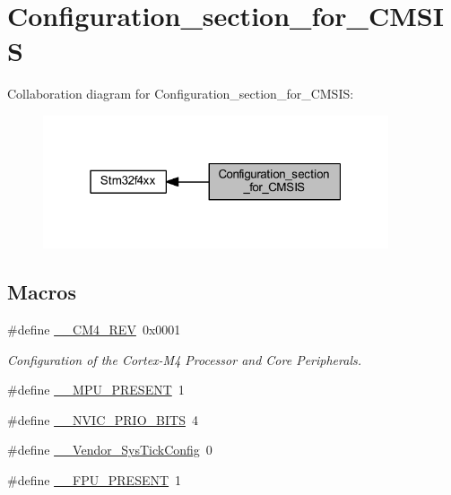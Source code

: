 \hypertarget{group___configuration__section__for___c_m_s_i_s}{}\section{Configuration\+\_\+section\+\_\+for\+\_\+\+C\+M\+S\+IS}
\label{group___configuration__section__for___c_m_s_i_s}
Collaboration diagram for Configuration\+\_\+section\+\_\+for\+\_\+\+C\+M\+S\+IS\+:
\nopagebreak
\begin{figure}[H]
\begin{center}
\leavevmode
\includegraphics[width=289pt]{group___configuration__section__for___c_m_s_i_s}
\end{center}
\end{figure}
\subsection*{Macros}
\begin{DoxyCompactItemize}
\item 
\#define \hyperlink{group___configuration__section__for___c_m_s_i_s_ga45a97e4bb8b6ce7c334acc5f45ace3ba}{\+\_\+\+\_\+\+C\+M4\+\_\+\+R\+EV}~0x0001
\begin{DoxyCompactList}\small\item\em Configuration of the Cortex-\/\+M4 Processor and Core Peripherals. \end{DoxyCompactList}\item 
\#define \hyperlink{group___configuration__section__for___c_m_s_i_s_ga4127d1b31aaf336fab3d7329d117f448}{\+\_\+\+\_\+\+M\+P\+U\+\_\+\+P\+R\+E\+S\+E\+NT}~1
\item 
\#define \hyperlink{group___configuration__section__for___c_m_s_i_s_gae3fe3587d5100c787e02102ce3944460}{\+\_\+\+\_\+\+N\+V\+I\+C\+\_\+\+P\+R\+I\+O\+\_\+\+B\+I\+TS}~4
\item 
\#define \hyperlink{group___configuration__section__for___c_m_s_i_s_gab58771b4ec03f9bdddc84770f7c95c68}{\+\_\+\+\_\+\+Vendor\+\_\+\+Sys\+Tick\+Config}~0
\item 
\#define \hyperlink{group___configuration__section__for___c_m_s_i_s_gac1ba8a48ca926bddc88be9bfd7d42641}{\+\_\+\+\_\+\+F\+P\+U\+\_\+\+P\+R\+E\+S\+E\+NT}~1
\end{DoxyCompactItemize}
